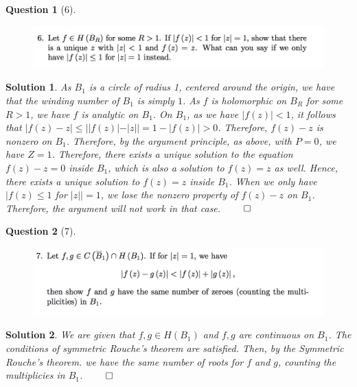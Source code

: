 \documentclass{article} %
\theoremstyle{quest}
\newtheorem*{question}{Question}
\newtheorem*{solution}{Solution}
\begin{document}
\bigskip

\begin{question}[6]
\hfill
\begin{figure}[h!]
\centering
\includegraphics[width=1\textwidth]{cv-9-6}
\end{figure}
\end{question}
\begin{solution}
As $B_1$ is a circle of radius 1, centered around the origin, we
have that the winding number of $B_1$ is simply $1$. As $f$ is holomorphic
on $B_R$ for some $R > 1$, we have $f$ is analytic on $B_1$. On $B_1$, as 
we have $|f(z)| < 1$, it follows that 
$|f(z) - z| \leq ||f(z)| - |z|| = 1 - |f(z)| > 0$. Therefore, $f(z) - z$
is nonzero on $B_1$. Therefore, by the argument principle, as above,
with $P = 0$, we have $Z = 1$. Therefore, there exists a unique solution 
to the equation $f(z) - z = 0$ inside $B_1$, 
which is also a solution to $f(z) = z$ as well.
Hence, there exists a unique solution to $f(z) = z$ inside $B_1$. When
we only have $|f(z) \leq 1$ for $|z|| = 1$, we lose the nonzero property
of $f(z) - z$ on $B_1$. Therefore, the argument will not work in that case.
\hfill $\qed$
\end{solution}

\bigskip

\begin{question}[7]
\hfill
\begin{figure}[h!]
\centering
\includegraphics[width=1\textwidth]{cv-9-7}
\end{figure}
\end{question}
\begin{solution}
We are given that $f,g \in H(B_1)$ and $f,g$ are continuous on $B_1$. 
The conditions of symmetric Rouche's theorem are satisfied.
Then, by the Symmetric Rouche's theorem. we have the same number of
roots for $f$ and $g$, counting the multiplicies in $B_1$. 
\hfill $\qed$
\end{solution}
\end{document}
